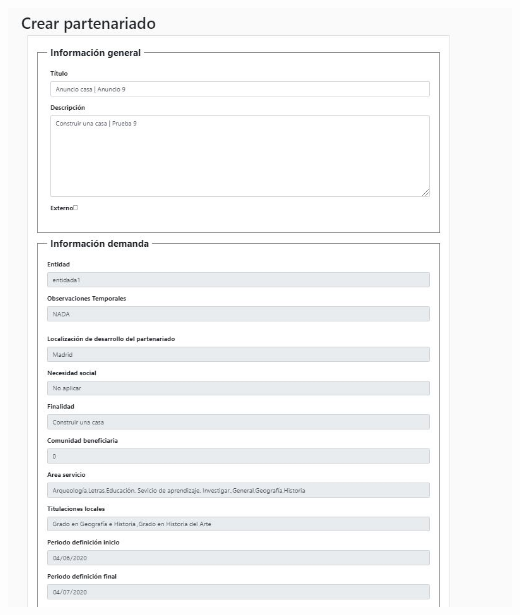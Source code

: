 \documentclass[11pt]{article}
\begin{document}
 
 \includegraphics[width=\textwidth]{partenariado1}
 \\\\

 
 
\end{document}
